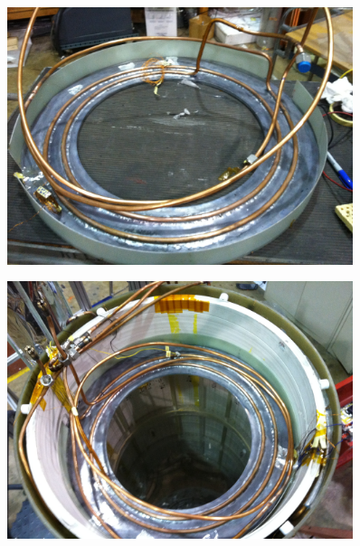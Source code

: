 \documentclass{beamer}
\begin{document}
\begin{frame}
\begin{columns}
    \begin{column}{0.5\textwidth}
    \begin{figure}
    \includegraphics[width=0.9\textwidth]
    {figures/top_endcap_pic.jpg}
    \end{figure}
    \begin{figure}
    \includegraphics[width=0.9\textwidth]
    {figures/endcap_installed.jpg}
    \end{figure}
    \end{column}
    

    \end{columns}

\end{frame}
\end{document}
